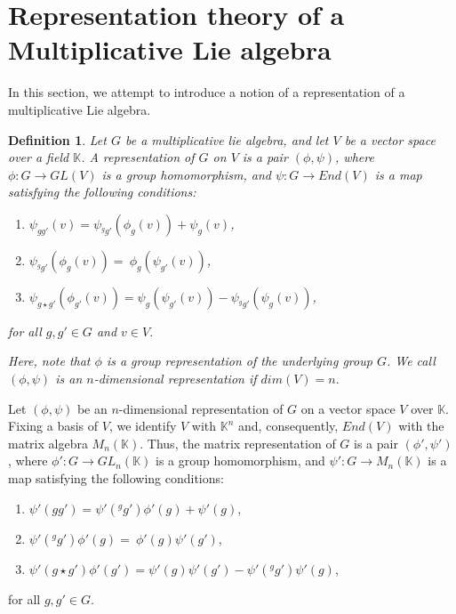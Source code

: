 \documentclass[10 pt,oneside,reqno,a4paper]{amsart}
\newtheorem{definition}{Definition}[section]
\numberwithin{equation}{section}
\begin{document}
	

  \section{Representation theory of a Multiplicative Lie algebra }
  In this section, we attempt to introduce a notion of a representation of a multiplicative Lie algebra. 

\begin{definition}\label{A} Let $G$ be a multiplicative lie algebra, and let $V$ be a vector space over a field $\mathbb{K}$. A representation of $G$ on $V$ is a pair $(\phi,\psi)$, where  
$\phi : G\to GL(V)$ is a group homomorphism, and $\psi : G \to End(V)$ is a map satisfying the following conditions:
\begin{enumerate}
    \item $\psi_{gg'}(v)= \psi_{^g{g'}}(\phi_g(v)) + \psi_g(v)$,
    \item  $\psi_{{^gg'}}( {\phi_g(v)}) =~  \phi_g({\psi_{g'}({v})})$,
    \item $\psi_{g \star g'}(\phi_{g'}(v))=\psi_{g}(\psi_{g'}(v))- \psi_{^g{g'}}(\psi_g(v))$,
\end{enumerate}
for all $g, g'\in G$ and $v\in V.$

Here, note that $\phi$ is a group representation of the underlying group $G$. We call $(\phi,\psi)$ is an $n$-dimensional representation if $dim(V)= n.$
\end{definition}


Let $(\phi,\psi)$ be an $n$-dimensional representation of $G$ on a vector space $V$ over $\mathbb{K}$. Fixing a basis of $V$, we identify $V$ with $\mathbb{K}^n$ and, consequently, $End(V)$ with the matrix algebra $M_n(\mathbb{K})$. Thus, the matrix representation of $G$ is a pair $(\phi',\psi')$, where 
$\phi' : G\to GL_n(\mathbb{K})$ is a group homomorphism, and $\psi' : G \to M_n(\mathbb{K})$ is a map satisfying the following conditions:
\begin{enumerate}
    \item $\psi'(gg')= \psi'(^g{g'})\phi'(g) + \psi'(g)$,
    \item  $\psi'({^gg'}) \phi'(g) =~  \phi'(g)\psi'(g')$,
    \item $\psi'(g \star g')\phi'(g')=\psi'(g)\psi'(g') - \psi'(^g{g'})\psi'(g)$,
\end{enumerate}
for all $g, g'\in G.$
\end{document}
